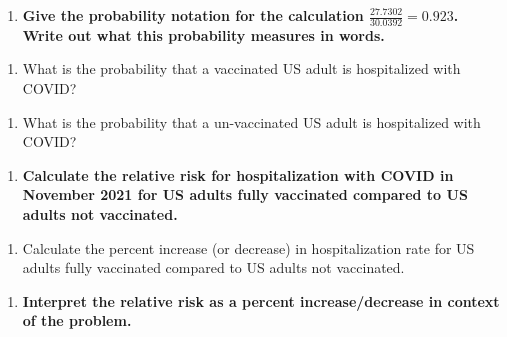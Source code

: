\documentclass[
]{report}
\providecommand{\tightlist}{%
  \setlength{\itemsep}{0pt}\setlength{\parskip}{0pt}}
\begin{document}
\vspace{0.8in}

\newpage

\begin{enumerate}
\def\labelenumi{\arabic{enumi}.}
\setcounter{enumi}{3}
\tightlist
\item
  \textbf{Give the probability notation for the calculation \(\frac{27.7302}{30.0392} = 0.923\). Write out what this probability measures in words.}
\end{enumerate}

\vspace{0.8in}

\begin{enumerate}
\def\labelenumi{\arabic{enumi}.}
\setcounter{enumi}{4}
\tightlist
\item
  What is the probability that a vaccinated US adult is hospitalized with COVID?
\end{enumerate}

\vspace{0.5in}

\begin{enumerate}
\def\labelenumi{\arabic{enumi}.}
\setcounter{enumi}{5}
\tightlist
\item
  What is the probability that a un-vaccinated US adult is hospitalized with COVID?
\end{enumerate}

\vspace{0.5in}

\begin{enumerate}
\def\labelenumi{\arabic{enumi}.}
\setcounter{enumi}{6}
\tightlist
\item
  \textbf{Calculate the relative risk for hospitalization with COVID in November 2021 for US adults fully vaccinated compared to US adults not vaccinated.}
\end{enumerate}

\vspace{0.5in}

\begin{enumerate}
\def\labelenumi{\arabic{enumi}.}
\setcounter{enumi}{7}
\tightlist
\item
  Calculate the percent increase (or decrease) in hospitalization rate for US adults fully vaccinated compared to US adults not vaccinated.
\end{enumerate}

\vspace{0.5in}

\begin{enumerate}
\def\labelenumi{\arabic{enumi}.}
\setcounter{enumi}{8}
\tightlist
\item
  \textbf{Interpret the relative risk as a percent increase/decrease in context of the problem.}
\end{enumerate}
\end{document}
